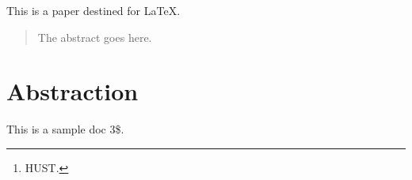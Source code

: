 \documentclass[a4paper,14pt]{article}
\title{}
\author{Mr.D\thanks{HUST.}}
\date{July 2023}
\begin{document}
\maketitle
This is a paper destined for \LaTeX.


\begin{abstract}
The abstract goes here.
\end{abstract}
\section{Abstraction}
This is a sample doc 3\$.
\end{document}
